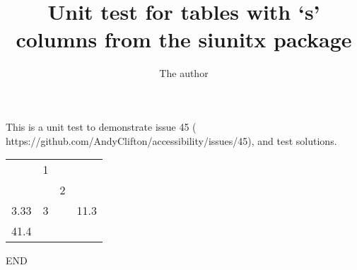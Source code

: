 \documentclass{article}
\title{Unit test for tables with `s' columns from the siunitx package}
\author{The author}
\begin{document}
\maketitle

This is a unit test to demonstrate issue 45 ( https://github.com/AndyClifton/accessibility/issues/45), and test solutions.

\begin{tabular}{SSSS}  
    & 1 &   &      \\
    &   & 2 &      \\
3.33 & 3 &   & 11.3 \\
41.4 &   &   & \\
\end{tabular}

END
\end{document}
